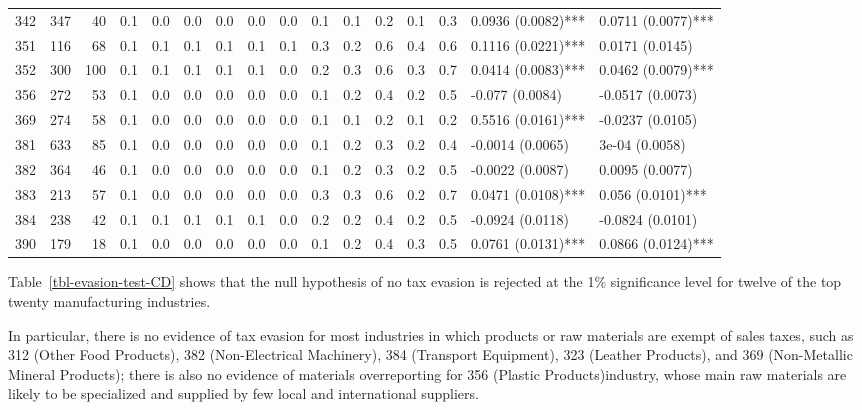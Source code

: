 \documentclass[
  12pt]{article}
\theoremstyle{definition}
\theoremstyle{remark}
\begin{document}
\begin{table}
{\begin{tabular}[t]{r|r|r|r|r|r|r|r|r|r|r|r|r|r|l|l}
\cline{1-16}
342 & 347 & 40 & 0.1 & 0.0 & 0.0 & 0.0 & 0.0 & 0.0 & 0.1 & 0.1 & 0.2 & 0.1 & 0.3 & 0.0936 (0.0082)*** & 0.0711 (0.0077)***\\
\cline{1-16}
351 & 116 & 68 & 0.1 & 0.1 & 0.1 & 0.1 & 0.1 & 0.1 & 0.3 & 0.2 & 0.6 & 0.4 & 0.6 & 0.1116 (0.0221)*** & 0.0171 (0.0145)\\
\cline{1-16}
352 & 300 & 100 & 0.1 & 0.1 & 0.1 & 0.1 & 0.1 & 0.0 & 0.2 & 0.3 & 0.6 & 0.3 & 0.7 & 0.0414 (0.0083)*** & 0.0462 (0.0079)***\\
\cline{1-16}
356 & 272 & 53 & 0.1 & 0.0 & 0.0 & 0.0 & 0.0 & 0.0 & 0.1 & 0.2 & 0.4 & 0.2 & 0.5 & -0.077 (0.0084) & -0.0517 (0.0073)\\
\cline{1-16}
369 & 274 & 58 & 0.1 & 0.0 & 0.0 & 0.0 & 0.0 & 0.0 & 0.1 & 0.1 & 0.2 & 0.1 & 0.2 & 0.5516 (0.0161)*** & -0.0237 (0.0105)\\
\cline{1-16}
381 & 633 & 85 & 0.1 & 0.0 & 0.0 & 0.0 & 0.0 & 0.0 & 0.1 & 0.2 & 0.3 & 0.2 & 0.4 & -0.0014 (0.0065) & 3e-04 (0.0058)\\
\cline{1-16}
382 & 364 & 46 & 0.1 & 0.0 & 0.0 & 0.0 & 0.0 & 0.0 & 0.1 & 0.2 & 0.3 & 0.2 & 0.5 & -0.0022 (0.0087) & 0.0095 (0.0077)\\
\cline{1-16}
383 & 213 & 57 & 0.1 & 0.0 & 0.0 & 0.0 & 0.0 & 0.0 & 0.3 & 0.3 & 0.6 & 0.2 & 0.7 & 0.0471 (0.0108)*** & 0.056 (0.0101)***\\
\cline{1-16}
384 & 238 & 42 & 0.1 & 0.1 & 0.1 & 0.1 & 0.1 & 0.0 & 0.2 & 0.2 & 0.4 & 0.2 & 0.5 & -0.0924 (0.0118) & -0.0824 (0.0101)\\
\cline{1-16}
390 & 179 & 18 & 0.1 & 0.0 & 0.0 & 0.0 & 0.0 & 0.0 & 0.1 & 0.2 & 0.4 & 0.3 & 0.5 & 0.0761 (0.0131)*** & 0.0866 (0.0124)***\\
\hline
\end{tabular}

}

\end{table}%

Table~\ref{tbl-evasion-test-CD} shows that the null hypothesis of no tax
evasion is rejected at the 1\% significance level for twelve of the top
twenty manufacturing industries.

In particular, there is no evidence of tax evasion for most industries
in which products or raw materials are exempt of sales taxes, such as
312 (Other Food Products), 382 (Non-Electrical Machinery), 384
(Transport Equipment), 323 (Leather Products), and 369 (Non-Metallic
Mineral Products); there is also no evidence of materials overreporting
for 356 (Plastic Products)industry, whose main raw materials are likely
to be specialized and supplied by few local and international suppliers.
\end{document}
